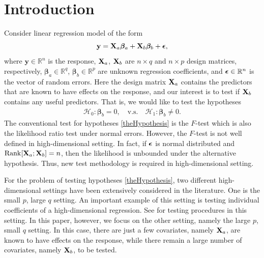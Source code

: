 \documentclass[smallextended]{svjour3}       %
\DeclareMathOperator{\myRank}{Rank}
\newcommand{\By}{\mathbf{y}}    \newcommand{\Bz}{\mathbf{z}}
\newcommand{\bfsym}[1]{\ensuremath{\boldsymbol{#1}}}
\def\bbeta{\bfsym \beta}
\begin{document}
\section{Introduction} 
Consider linear regression model of the form
\begin{equation}\label{label:linearModel}
    \By = 
    \BX_a \bbeta_a + \BX_b \bbeta_b + \bepsilon, %
\end{equation}
where $\By \in \mathbb R^n$ is the response, $\mathbf{X}_a$, $\mathbf{X}_b$ are $n\times q$ and $n\times p$ design matrices, respectively,  $\bbeta_a\in \mathbb R^q$, $\bbeta_b\in \mathbb R^p$ are unknown regression coefficients, and 
$\bepsilon\in \mathbb R^n$ is the vector of random errors.
Here the design matrix $\mathbf{X}_a$ contains the predictors that are known to have effects on the response,
and our interest is to test if $\mathbf{X}_b$ contains any useful predictors.
That is, we would like to test the hypotheses
\begin{align}\label{theHypothesis}
    \mathcal H_0:   \bbeta_b =0,\quad
    \text{v.s.} \quad
    \mathcal H_1:   \bbeta_b \neq 0.
\end{align}
The conventional test for hypotheses \eqref{theHypothesis} is the $F$-test which is also the likelihood ratio test under normal errors.
However, the $F$-test is not well defined in high-dimensional setting.
In fact, if $\bepsilon$ is normal distributed and $\myRank[\BX_a;\BX_b]=n$, then the likelihood is unbounded under the alternative hypothesis.
Thus, new test methodology is required in high-dimensional setting.

For the problem of testing hypotheses \eqref{theHypothesis}, two different high-dimensional settings have been extensively considered in the literature.
One is the small $p$, large $q$ setting.
An important example of this setting is testing individual coefficients of a high-dimensional regression.
See \cite{buhlmann2013statistical,Zhang2013,Lan2016} for testing procedures in this setting.
In this paper, however, we focus on the other setting, namely the large $p$, small $q$ setting.
In this case, there are just a few covariates, namely $\mathbf{X}_a$, are known to have effects on the response, while there remain a large number of covariates, namely $\mathbf{X}_b$, to be tested.
\end{document}
